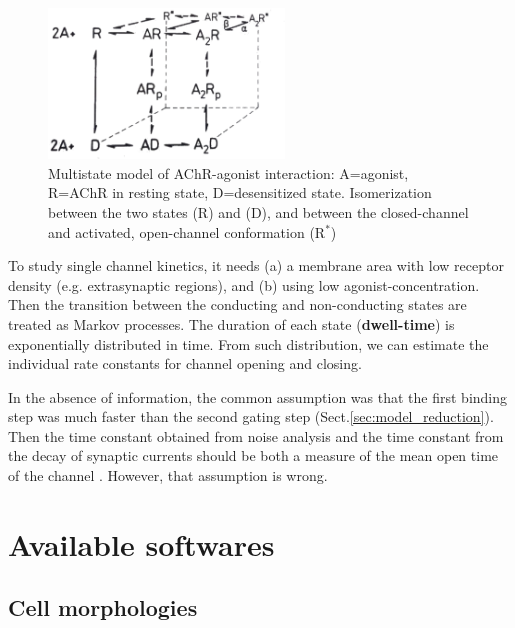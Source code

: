 \begin{figure}[hbt]
  \centerline{\includegraphics[height=4cm,
    angle=0]{./images/AChR-agonist_model.eps}}
\caption{Multistate model of AChR-agonist interaction: A=agonist, R=AChR in
resting state, D=desensitized state. Isomerization between the two states (R)
and (D), and between the closed-channel and activated, open-channel conformation
(R$^*$)\citep{barrantes1983}}
\label{fig:AChR-agonist}
\end{figure}

To study single channel kinetics, it needs (a) a membrane area with low receptor
density (e.g. extrasynaptic regions), and (b) using low agonist-concentration.
Then the transition between the conducting and non-conducting states are treated
as Markov processes. The duration of each state ({\bf dwell-time}) is
exponentially distributed in time. From such distribution, we can estimate the
individual rate constants for channel opening and closing.

 In the absence of information, the common assumption was that the first
binding step was much faster than the second gating step
(Sect.\ref{sec:model_reduction}). Then the time constant obtained from noise
analysis and the time constant from the decay of synaptic currents should be
both a measure of the mean open time of the channel \citep{colquhoun2002}.
However, that assumption is wrong.


\section{Available softwares}
\label{sec:available-softwares}

\subsection{Cell morphologies}

